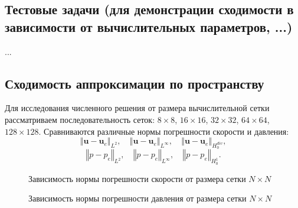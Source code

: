 \documentclass[a4paper,10pt]{report}
\begin{document}
\subsection{Тестовые задачи (для демонстрации сходимости в зависимости от вычислительных параметров, ...)}
...

\subsection{Сходимость аппроксимации по пространству}

Для исследования численного решения от размера вычислительной сетки рассматриваем последовательность сеток: $8\times8$, $16\times16$, $32\times32$, $64\times64$, $128\times128$. Сравниваются различные нормы погрешности скорости и давления: 
\[
\left\Vert \bm{u} - \bm{u}_e \right\Vert_{L^2}, \quad
\left\Vert \bm{u} - \bm{u}_e \right\Vert_{L^\infty}, \quad
\left\Vert \bm{u} - \bm{u}_e \right\Vert_{H^{div}_0},
\]
\[
\left\Vert p - p_e \right\Vert_{L^2}, \quad
\left\Vert p - p_e \right\Vert_{L^\infty}, \quad
\left\Vert p - p_e \right\Vert_{H^1_0}.
\]

\begin{figure}[h]
\centering
{}
\caption{Зависимость нормы погрешности скорости от размера сетки $N \times N$}
\label{fig:shifted-vortex-meshes-u}
\end{figure}
\begin{figure}[h]
\centering
{}
\caption{Зависимость нормы погрешности давления от размера сетки $N \times N$}
\label{fig:shifted-vortex-meshes-p}
\end{figure}
\end{document}
